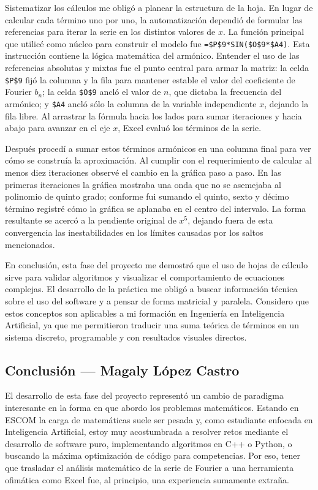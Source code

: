 Sistematizar los cálculos me obligó a planear la estructura de la hoja. En lugar de calcular cada término uno por uno, la automatización dependió de formular las referencias para iterar la serie en los distintos valores de $x$. La función principal que utilicé como núcleo para construir el modelo fue \texttt{=\$P\$9*SIN(\$O\$9*\$A4)}. Esta instrucción contiene la lógica matemática del armónico. Entender el uso de las referencias absolutas y mixtas fue el punto central para armar la matriz: la celda \texttt{\$P\$9} fijó la columna y la fila para mantener estable el valor del coeficiente de Fourier $b_n$; la celda \texttt{\$O\$9} ancló el valor de $n$, que dictaba la frecuencia del armónico; y \texttt{\$A4} ancló sólo la columna de la variable independiente $x$, dejando la fila libre. Al arrastrar la fórmula hacia los lados para sumar iteraciones y hacia abajo para avanzar en el eje $x$, Excel evaluó los términos de la serie.

Después procedí a sumar estos términos armónicos en una columna final para ver cómo se construía la aproximación. Al cumplir con el requerimiento de calcular al menos diez iteraciones observé el cambio en la gráfica paso a paso. En las primeras iteraciones la gráfica mostraba una onda que no se asemejaba al polinomio de quinto grado; conforme fui sumando el quinto, sexto y décimo término registré cómo la gráfica se aplanaba en el centro del intervalo. La forma resultante se acercó a la pendiente original de $x^5$, dejando fuera de esta convergencia las inestabilidades en los límites causadas por los saltos mencionados.

En conclusión, esta fase del proyecto me demostró que el uso de hojas de cálculo sirve para validar algoritmos y visualizar el comportamiento de ecuaciones complejas. El desarrollo de la práctica me obligó a buscar información técnica sobre el uso del software y a pensar de forma matricial y paralela. Considero que estos conceptos son aplicables a mi formación en Ingeniería en Inteligencia Artificial, ya que me permitieron traducir una suma teórica de términos en un sistema discreto, programable y con resultados visuales directos.

\subsection{Conclusión — Magaly López Castro}
\label{sec:cap02:concl:magaly}

El desarrollo de esta fase del proyecto representó un cambio de paradigma interesante en la forma en que abordo los problemas matemáticos. Estando en ESCOM la carga de matemáticas suele ser pesada y, como estudiante enfocada en Inteligencia Artificial, estoy muy acostumbrada a resolver retos mediante el desarrollo de software puro, implementando algoritmos en C++ o Python, o buscando la máxima optimización de código para competencias. Por eso, tener que trasladar el análisis matemático de la serie de Fourier a una herramienta ofimática como Excel fue, al principio, una experiencia sumamente extraña.

